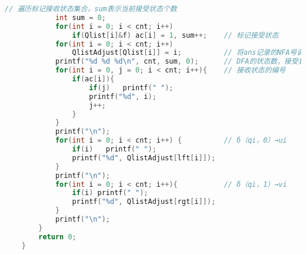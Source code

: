 \begin{lstlisting}[language=c]
            // 遍历标记接收状态集合，sum表示当前接受状态个数
            int sum = 0;    
            for(int i = 0; i < cnt; i++)
                if(Qlist[i]&f) ac[i] = 1, sum++;    // 标记接受状态
            for(int i = 0; i < cnt; i++)
                QlistAdjust[Qlist[i]] = i;          // 将ans记录的NFA号调整到DFA上来 
            printf("%d %d %d\n", cnt, sum, 0);      // DFA的状态数，接受状态数，起始状态的编号
            for(int i = 0, j = 0; i < cnt; i++){    // 接收状态的编号
                if(ac[i]){
                    if(j)   printf(" ");
                    printf("%d", i);
                    j++;
                }
            }
            printf("\n");
            for(int i = 0; i < cnt; i++) {          // δ（qi，0）→ui
                if(i)   printf(" ");
                printf("%d", QlistAdjust[lft[i]]);
            }
            printf("\n");
            for(int i = 0; i < cnt; i++){           // δ（qi，1）→vi
                if(i) printf(" ");
                printf("%d", QlistAdjust[rgt[i]]);
            }
            printf("\n");
        }
        return 0;
    }
\end{lstlisting}